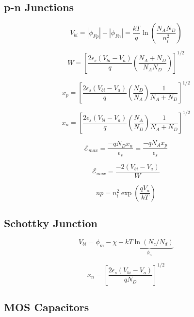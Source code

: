 \documentclass{infosheet}
\begin{document}
\subsection{p-n Junctions}

\begin{displaymath}
  V_{bi} = |\phi_{Fp}| + |\phi_{Fn}| = \frac{kT}{q}\ln\left(\frac{N_AN_D}{n_i^2}\right)
\end{displaymath}

\begin{displaymath}
  W = \left[\frac{2\epsilon_s(V_{bi}-V_a)}{q}\left(\frac{N_A + N_D}{N_AN_D}\right)\right]^{1/2}
\end{displaymath}

\begin{displaymath}
  x_p = \left[\frac{2\epsilon_s(V_{bi}-V_a)}{q}\left(\frac{N_D}{N_A}\right)\frac{1}{N_A+N_D}\right]^{1/2}
\end{displaymath}

\begin{displaymath}
  x_n = \left[\frac{2\epsilon_s(V_{bi}-V_a)}{q}\left(\frac{N_A}{N_D}\right)\frac{1}{N_A+N_D}\right]^{1/2}
\end{displaymath}

\begin{displaymath}
  \mathcal{E}_{max} = \frac{-qN_Dx_n}{\epsilon_s} = \frac{-qN_Ax_p}{\epsilon_s}
\end{displaymath}

\begin{displaymath}
  \mathcal{E}_{max} = \frac{-2(V_{bi} - V_a)}{W}
\end{displaymath}

\begin{displaymath}
  np=n_i^2\exp\left(\frac{qV_a}{kT}\right)
\end{displaymath}

\subsection{Schottky Junction}

\begin{displaymath}
  V_{bi} = \phi_m - \chi - \underbrace{kT\ln(N_c/N_d)}_{\phi_n}
\end{displaymath}

\begin{displaymath}
  x_n = \left[\frac{2\epsilon_s(V_{bi} - V_a)}{qN_D}\right]^{1/2}
\end{displaymath}

\subsection{MOS Capacitors}

\lipsum[1-4]
\end{document}

